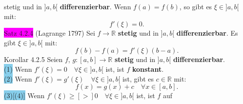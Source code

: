 \documentclass[landscape, 10pt]{article}
\newcommand{\R}{\mathbb{R}}
\begin{document}
\begin{multicols}{3}
                     stetig und in \textcolor{NavyBlue}{$]a,b[$} 
                     \textbf{differenzierbar}. 
                     Wenn \textcolor{NavyBlue}{$f(a)=f(b)$}, 
                     so gibt es 
                     \textcolor{NavyBlue}{$\xi\in]a,b[$} mit: 
                     \begin{equation*}
                            f'(\xi)=0.
                     \end{equation*}
              \colorbox{magenta}{Satz 4.2.4}
              (Lagrange 1797) 
                     Sei \textcolor{NavyBlue}{
                     $f\longrightarrow\R$}
                     \textbf{stetig} und in 
                     \textcolor{NavyBlue}{$]a,b[$} 
                     \textbf{differenzierbar}. 
                     Es gibt \textcolor{NavyBlue}{
                     $\xi\in]a,b[$} mit: 
                     \begin{equation*}
                            f(b)-f(a)=f'(\xi)(b-a).
                     \end{equation*}
              \colorbox{BurntOrange}{Korollar 4.2.5} 
                     Seien \textcolor{NavyBlue}{$f$},
                     \textcolor{NavyBlue}{$g:[a,b]\longrightarrow\R$}
                     \textbf{stetig} und in 
                     \textcolor{NavyBlue}{$]a,b[$} 
                     \textbf{differenzierbar}.\\
                     \colorbox{SkyBlue}{(1)} Wenn 
                            \textcolor{NavyBlue}{
                            $f'(\xi)=0\quad\forall\xi\in]a,b[$} 
                            ist, ist \textcolor{NavyBlue}{$f$} 
                            \textbf{konstant}.\\
                     \colorbox{SkyBlue}{(2)} 
                            Wenn \textcolor{NavyBlue}{
                            $f'(\xi)=g'(\xi)\quad
                            \forall\xi\in]a,b[$} 
                            ist, gibt es 
                            \textcolor{NavyBlue}{$c\in\R$} mit: 
                            \begin{equation*}
                                   f(x)=g(x)+c\quad
                                   \forall x\in[a,b].
                            \end{equation*}
                     \colorbox{SkyBlue}{(3)[(4)]}
                            Wenn \textcolor{NavyBlue}{
                            $f'(\xi)\geqslant[>]0\quad
                            \forall\xi\in]a,b[$} ist, 
                            ist \textcolor{NavyBlue}{$f$} auf 

\end{multicols}
\end{document}
